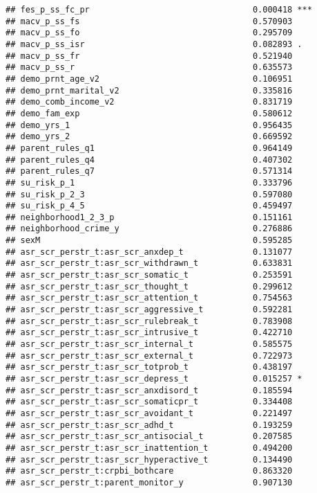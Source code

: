 \documentclass[
]{article}
\begin{document}
\begin{verbatim}
## fes_p_ss_fc_pr                                 0.000418 ***
## macv_p_ss_fs                                   0.570903    
## macv_p_ss_fo                                   0.295709    
## macv_p_ss_isr                                  0.082893 .  
## macv_p_ss_fr                                   0.521940    
## macv_p_ss_r                                    0.635573    
## demo_prnt_age_v2                               0.106951    
## demo_prnt_marital_v2                           0.335816    
## demo_comb_income_v2                            0.831719    
## demo_fam_exp                                   0.580612    
## demo_yrs_1                                     0.956435    
## demo_yrs_2                                     0.669592    
## parent_rules_q1                                0.964149    
## parent_rules_q4                                0.407302    
## parent_rules_q7                                0.571314    
## su_risk_p_1                                    0.333796    
## su_risk_p_2_3                                  0.597080    
## su_risk_p_4_5                                  0.459497    
## neighborhood1_2_3_p                            0.151161    
## neighborhood_crime_y                           0.276886    
## sexM                                           0.595285    
## asr_scr_perstr_t:asr_scr_anxdep_t              0.131077    
## asr_scr_perstr_t:asr_scr_withdrawn_t           0.633831    
## asr_scr_perstr_t:asr_scr_somatic_t             0.253591    
## asr_scr_perstr_t:asr_scr_thought_t             0.299612    
## asr_scr_perstr_t:asr_scr_attention_t           0.754563    
## asr_scr_perstr_t:asr_scr_aggressive_t          0.592281    
## asr_scr_perstr_t:asr_scr_rulebreak_t           0.783908    
## asr_scr_perstr_t:asr_scr_intrusive_t           0.422710    
## asr_scr_perstr_t:asr_scr_internal_t            0.585575    
## asr_scr_perstr_t:asr_scr_external_t            0.722973    
## asr_scr_perstr_t:asr_scr_totprob_t             0.438197    
## asr_scr_perstr_t:asr_scr_depress_t             0.015257 *  
## asr_scr_perstr_t:asr_scr_anxdisord_t           0.185594    
## asr_scr_perstr_t:asr_scr_somaticpr_t           0.334408    
## asr_scr_perstr_t:asr_scr_avoidant_t            0.221497    
## asr_scr_perstr_t:asr_scr_adhd_t                0.193259    
## asr_scr_perstr_t:asr_scr_antisocial_t          0.207585    
## asr_scr_perstr_t:asr_scr_inattention_t         0.494200    
## asr_scr_perstr_t:asr_scr_hyperactive_t         0.134490    
## asr_scr_perstr_t:crpbi_bothcare                0.863320    
## asr_scr_perstr_t:parent_monitor_y              0.907130    

\end{verbatim}
\end{document}
